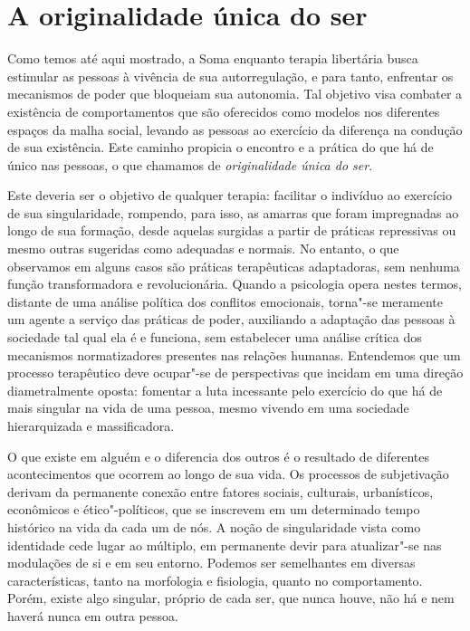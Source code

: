 \section{A originalidade única do ser}

Como temos até aqui mostrado, a Soma enquanto terapia libertária busca
estimular as pessoas à vivência de sua autorregulação, e para tanto,
enfrentar os mecanismos de poder que bloqueiam sua autonomia. Tal
objetivo visa combater a existência de comportamentos que são oferecidos
como modelos nos diferentes espaços da malha social, levando as pessoas
ao exercício da diferença na condução de sua existência. Este caminho
propicia o encontro e a prática do que há de único nas pessoas, o que
chamamos de \emph{originalidade única do ser}.

Este deveria ser o objetivo de qualquer terapia: facilitar o indivíduo
ao exercício de sua singularidade, rompendo, para isso, as amarras que
foram impregnadas ao longo de sua formação, desde aquelas surgidas a
partir de práticas repressivas ou mesmo outras sugeridas como adequadas
e normais. No entanto, o que observamos em alguns casos são práticas
terapêuticas adaptadoras, sem nenhuma função transformadora e
revolucionária. Quando a psicologia opera nestes termos, distante de
uma análise política dos conflitos emocionais, torna"-se meramente um
agente a serviço das práticas de poder, auxiliando a adaptação das
pessoas à sociedade tal qual ela é e funciona, sem estabelecer uma
análise crítica dos mecanismos normatizadores presentes nas relações
humanas. Entendemos que um processo terapêutico deve ocupar"-se de
perspectivas que incidam em uma direção diametralmente oposta: fomentar
a luta incessante pelo exercício do que há de mais singular na vida de
uma pessoa, mesmo vivendo em uma sociedade hierarquizada e
massificadora.

O que existe em alguém e o diferencia dos outros é o resultado de
diferentes acontecimentos que ocorrem ao longo de sua vida. Os processos
de subjetivação derivam da permanente conexão entre fatores sociais,
culturais, urbanísticos, econômicos e ético"-políticos, que se inscrevem
em um determinado tempo histórico na vida da cada um de nós. A noção de
singularidade vista como identidade cede lugar ao múltiplo, em
permanente devir para atualizar"-se nas modulações de si e em seu
entorno. Podemos ser semelhantes em diversas características, tanto na
morfologia e fisiologia, quanto no comportamento. Porém, existe algo
singular, próprio de cada ser, que nunca houve, não há e nem haverá
nunca em outra pessoa.

